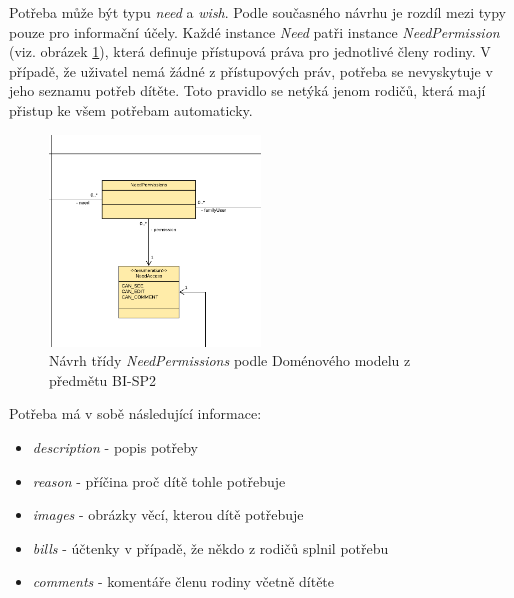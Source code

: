         Potřeba může být typu \textit{need} a \textit{wish}. Podle současného návrhu je rozdíl mezi typy pouze pro informační účely. Každé instance \textit{Need} patři instance \textit{NeedPermission} (viz. obrázek \ref{image:NeedPermissions1}), která definuje přístupová práva pro jednotlivé členy rodiny. V případě, že uživatel nemá žádné z přístupových práv, potřeba se nevyskytuje v jeho seznamu potřeb dítěte. Toto pravidlo se netýká jenom rodičů, která mají přistup ke všem potřebam automaticky. 
        \begin{figure}\centering
	        \includegraphics[width=0.5\textwidth]{pdfs/NeedPermissions1}
	        \caption[Návrh NeedPermissions]{Návrh třídy \textit{NeedPermissions} podle Doménového modelu z předmětu BI-SP2}\label{image:NeedPermissions1}
        \end{figure}
       
       Potřeba má v sobě následující informace:
        \begin{itemize}
            \item \textit{description} - popis potřeby
            \item \textit{reason} - příčina proč dítě tohle potřebuje
            \item \textit{images} - obrázky věcí, kterou dítě potřebuje
            \item \textit{bills} - účtenky v případě, že někdo z rodičů splnil potřebu
            \item \textit{comments} - komentáře členu rodiny včetně dítěte
        \end{itemize}
     
